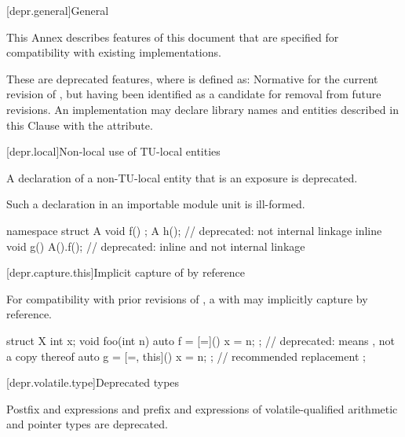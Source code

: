 
[depr.general]{General}

\pnum
This Annex describes features of this document
that are specified for compatibility with existing implementations.

\pnum
These are deprecated features, where
is defined as:
Normative for the current revision of \Cpp{},
but having been identified as a candidate for removal from future revisions.
An implementation may declare library names and entities described in this Clause with the
 attribute.

[depr.local]{Non-local use of TU-local entities}

\pnum
A declaration of a non-TU-local entity that is an exposure
is deprecated.
\begin{note}
Such a declaration in an importable module unit is ill-formed.
\end{note}
\begin{example}
\begin{codeblock}
namespace {
  struct A {
    void f() {}
  };
}
A h();                          // deprecated: not internal linkage
inline void g() {A().f();}      // deprecated: inline and not internal linkage
\end{codeblock}
\end{example}

[depr.capture.this]{Implicit capture of  by reference}

\pnum
For compatibility with prior revisions of \Cpp{},
a  with 
\tcode{=} may implicitly capture
 by reference.
\begin{example}
\begin{codeblock}
struct X {
  int x;
  void foo(int n) {
    auto f = [=]() { x = n; };          // deprecated:  means , not a copy thereof
    auto g = [=, this]() { x = n; };    // recommended replacement
  }
};
\end{codeblock}
\end{example}

[depr.volatile.type]{Deprecated  types}

\pnum
Postfix \tcode{++} and \tcode{--} expressions and
prefix \tcode{++} and \tcode{--} expressions
of volatile-qualified arithmetic and pointer types are deprecated.

